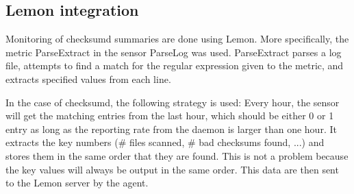 \subsection{Lemon integration}
\label{sec:lemon_integration}
Monitoring of checksumd summaries are done using Lemon. More specifically, the metric ParseExtract in the sensor ParseLog was used. ParseExtract parses a log file, attempts to find a match for the regular expression given to the metric, and extracts specified values from each line. 

In the case of checksumd, the following strategy is used: Every hour, the sensor will get the matching entries from the last hour, which should be either 0 or 1 entry as long as the reporting rate from the daemon is larger than one hour. It extracts the key numbers (\# files scanned, \# bad checksums found, ...) and stores them in the same order that they are found. This is not a problem because the key values will always be output in the same order. This data are then sent to the Lemon server by the agent.
